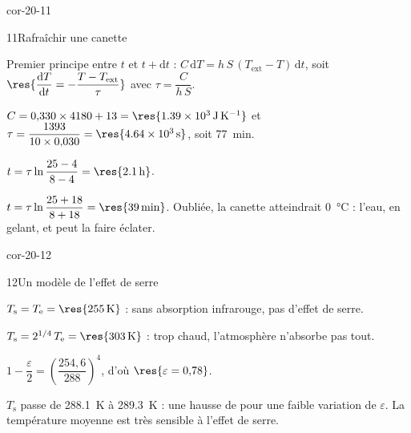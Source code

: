 \begin{blocLivre}{cor-20-11}
\begin{corrige}{11}{Rafraîchir une canette}
\begin{questions}
\item Premier principe entre $t$ et $t+\mathrm{d}t$ : $C\,\mathrm{d}T=h\,S\,(T_\mathrm{ext}-T)\,\mathrm{d}t$, soit
$\res{\dfrac{\mathrm{d}T}{\mathrm{d}t}=-\dfrac{T-T_\mathrm{ext}}{\tau}}$ avec $\tau=\dfrac{C}{h\,S}$.
\item $C=0{,}330\times4180+13=\res{\qty{1,39e3}{J.K^{-1}}}$ et $\tau=\dfrac{1393}{10\times0{,}030}=\res{\qty{4,64e3}{s}}$, soit \qty{77}{min}.
\item $t=\tau\ln\dfrac{25-4}{8-4}=\res{\qty{2,1}{h}}$.
\item $t=\tau\ln\dfrac{25+18}{8+18}=\res{\qty{39}{min}}$. Oubliée, la canette atteindrait \qty{0}{\degreeCelsius} : l'eau, en gelant,
 et peut la faire éclater.
\end{questions}
\end{corrige}
\end{blocLivre}
\begin{blocLivre}{cor-20-12}
\begin{corrige}{12}{Un modèle de l'effet de serre}
\begin{questions}
\item $T_\mathrm{s}=T_\mathrm{e}=\res{\qty{255}{K}}$ : sans absorption infrarouge, pas d'effet de serre.
\item $T_\mathrm{s}=2^{1/4}\,T_\mathrm{e}=\res{\qty{303}{K}}$ : trop chaud, l'atmosphère n'absorbe pas tout.
\item $1-\dfrac{\varepsilon}{2}=\left(\dfrac{254{,}6}{288}\right)^4$, d'où $\res{\varepsilon=0{,}78}$.
\item $T_\mathrm{s}$ passe de \qty{288,1}{K} à \qty{289,3}{K} : une hausse de  pour une faible variation de
$\varepsilon$. La température moyenne est très sensible à l'effet de serre.
\end{questions}
\end{corrige}
\end{blocLivre}
